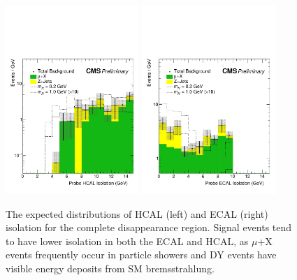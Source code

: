 \begin{figure}[htbp]
	\centering
	\includegraphics[width=0.45\textwidth]{figures/totDisappHcalIso.pdf}
	\hspace{0.01\textwidth}
	\includegraphics[width=0.45\textwidth]{figures/totDisappEcalIso.pdf}
	\caption[Expected Complete Disappearance Isolation]{The expected distributions of HCAL (left) and ECAL (right) isolation for the complete disappearance region. Signal events tend to have lower isolation in both the ECAL and HCAL, as $\mu$+X events frequently occur in particle showers and DY events have visible energy deposits from SM bremsstrahlung.}
	\label{fig:totHcalIso}
\end{figure}

